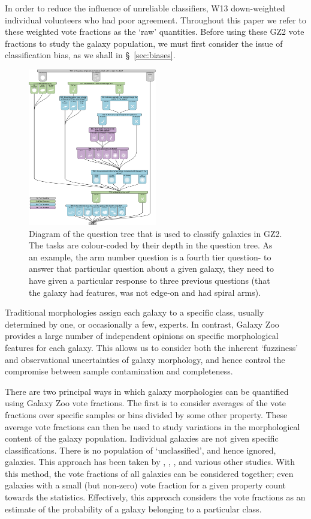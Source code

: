 \documentclass[useAMS,usenatbib]{mn2e}
\begin{document}
In order to reduce the influence of unreliable classifiers, W13 down-weighted individual volunteers who had poor agreement.  Throughout this paper we refer to these weighted vote fractions as the `raw' quantities. Before using these GZ2 vote fractions to study the galaxy population, we must first consider the issue of classification bias, as we shall in \S~\ref{sec:biases}.

\begin{figure}
		\centering
		\includegraphics[width=0.5\textwidth]{Images/Data/gz2_tree_crop.pdf}
    \caption{Diagram of the question tree that is used to classify galaxies in GZ2. The tasks are colour-coded by their depth in the question tree. As an example, the arm number question is a fourth tier question- to answer that particular question about a given galaxy, they need to have given a particular response to three previous questions (that the galaxy had features, was not edge-on and had spiral arms).}
    \label{fig:question_tree}
\end{figure}

Traditional morphologies assign each galaxy to a specific class, usually determined by one, or occasionally a few, experts. In contrast, Galaxy Zoo provides a large number of independent opinions on specific morphological features for each galaxy.  This allows us to consider both the inherent `fuzziness' and observational uncertainties of galaxy morphology, and hence control the compromise between sample contamination and completeness.

There are two principal ways in which galaxy morphologies can be quantified using Galaxy Zoo vote fractions. The first is to consider averages of the vote fractions over specific samples or bins divided by some other property.  These average vote fractions can then be used to study variations in the morphological content of the galaxy population.  Individual galaxies are not given specific classifications.  There is no population of `unclassified', and hence ignored, galaxies.  This approach has been taken by \citet{Bamford_09}, \citet{Casteels_13}, \citet{Willett_15}, and various other studies. With this method, the vote fractions of all galaxies can be considered together; even galaxies with a small (but non-zero) vote fraction for a given property count towards the statistics. Effectively, this approach considers the vote fractions as an estimate of the probability of a galaxy belonging to a particular class.
\end{document}
